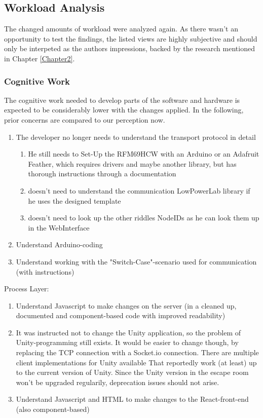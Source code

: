 \subsection{Workload Analysis}
The changed amounts of workload were analyzed again. 
As there wasn't an opportunity to test the findings, the listed views are highly subjective 
and should only be interpeted as the authors impressions, backed by the research mentioned in Chapter \ref{Chapter2}.
\subsubsection{Cognitive Work}
The cognitive work needed to develop parts 
of the software and hardware is expected to be considerably lower with the changes applied.
In the following, prior concerns are compared to our perception now.
\begin{enumerate}
    \item The developer no longer needs to understand the transport protocol in detail
    \begin{enumerate}
        \item 
        He still needs to Set-Up the RFM69HCW with an Arduino or an Adafruit Feather, 
        which requires drivers and maybe another library, but has thorough instructions through a documentation
        \item doesn't need to understand the communication LowPowerLab library if he uses the designed template
        \item doesn't need to look up the other riddles NodeIDs as he can look them up in the WebInterface
    \end{enumerate}   
    \item Understand Arduino-coding 
    \item Understand working with the "Switch-Case"-scenario used for communication (with instructions)
\end{enumerate}  
Process Layer:
\begin{enumerate}
    \item Understand Javascript to make changes on the server (in a cleaned up, documented and component-based code with improved readability)
    \item 
    It was instructed not to change the Unity application, so the problem of Unity-programming still exists. 
    It would be easier to change though, by replacing the TCP connection with a Socket.io connection. 
    There are multiple client implementations for Unity available \parencite{socketioUnity1, socketioUnity2,socketioUnity3}
    That reportedly work (at least) up to the current version of Unity. 
    Since the Unity version in the escape room won't be upgraded regularily, deprecation issues should not arise.
    \item Understand Javascript and HTML to make changes to the React-front-end (also component-based) 
\end{enumerate}  
